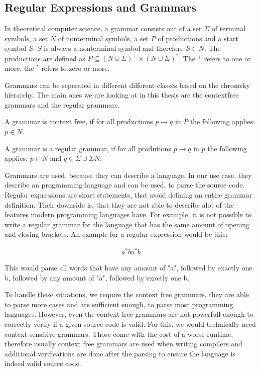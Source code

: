 \subsection{Regular Expressions and Grammars}

In theoretical computer science, a grammar consists out of a set $\Sigma$ of terminal symbols, a set $N$ of nonterminal symbols, a set $P$ of productions and a start symbol $S$. $S$ is always a nonterminal symbol and therefore $S \in N$. The productions are defined as $P \subseteq (N \cup \Sigma)^+ \times (N \cup \Sigma)^*$. The $^+$ refers to one or more, the $^*$ refers to zero or more.

Grammars can be seperated in different different classes based on the chromsky hierarchy. The main ones we are looking at in this thesis are the contextfree grammars and the regular grammars.

A grammar is context free, if for all productions $p \to q$ in $P$ the following applies: $p \in N$.

A grammar is a regular grammar, if for all produtions $p \to q$ in $p$ the following applies: $p \in N$ and $q \in \Sigma \cup \Sigma N$.

Grammars are used, because they can describe a language. In our use case, they describe an programming language and can be used, to parse the source code. Regular expressions are short statements, that avoid defining an entire grammar definition. Their downside is, that they are not able to describe alot of the features modern programming languages have. For example, it is not possible to write a regular grammar for the language that has the same amount of opening and closing brackets. An example for a regular expression would be this:

\begin{align*}
a^*ba^*b
\end{align*}

This would parse all words that have any amount of "a", followed by exactly one b, followed by any amount of "a", followed by exactly one b.

To handle these situations, we require the context free grammars, they are able to parse more cases and are sufficient enough, to parse most programming languages. However, even the context free grammars are not powerfull enough to correctly verify if a given source code is valid. For this, we would technically need context sensitive grammars. Those come with the cost of a worse runtime, therefore usually context free grammars are used when writing compilers and additional verifications are done after the parsing to ensure the language is indeed valid source code.

